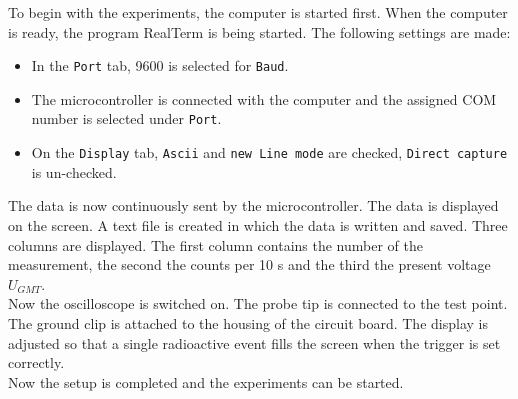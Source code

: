 %
To begin with the experiments, the computer is started first. When the computer is ready, the program RealTerm is being started. The following settings are made:
\begin{itemize}
	\item In the \texttt{Port} tab, 9600 is selected for \texttt{Baud}.
	\item The microcontroller is connected with the computer and the assigned COM number is selected under \texttt{Port}.
	\item On the \texttt{Display} tab, \texttt{Ascii} and \texttt{new Line mode} are checked, \texttt{Direct capture} is un-checked.
\end{itemize}
%
The data is now continuously sent by the microcontroller. The data is displayed on the screen. A text file is created in which the data is written and saved. Three columns are displayed. The first column contains the number of the measurement, the second the counts per 10 s and the third the present voltage $U_{GMT}$.\\
Now the oscilloscope is switched on. The probe tip is connected to the test point. The ground clip is attached to the housing of the circuit board. The display is adjusted so that a single radioactive event fills the screen when the trigger is set correctly.\\
Now the setup is completed and the experiments can be started.
